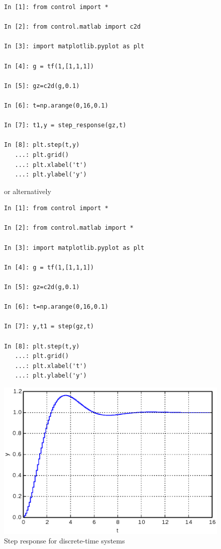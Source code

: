 \begin{figure}[htbp]	%
\begin{minipage}[t]{0.55\textwidth}
  \vspace{0pt}
\begin{lstlisting}[linewidth=7cm,xleftmargin=0cm]
In [1]: from control import *

In [2]: from control.matlab import c2d

In [3]: import matplotlib.pyplot as plt

In [4]: g = tf(1,[1,1,1])

In [5]: gz=c2d(g,0.1)

In [6]: t=np.arange(0,16,0.1)

In [7]: t1,y = step_response(gz,t)

In [8]: plt.step(t,y) 
   ...: plt.grid()
   ...: plt.xlabel('t')
   ...: plt.ylabel('y')
\end{lstlisting}

or alternatively

\begin{lstlisting}[linewidth=7cm,xleftmargin=0cm]
In [1]: from control import *

In [2]: from control.matlab import *

In [3]: import matplotlib.pyplot as plt

In [4]: g = tf(1,[1,1,1])

In [5]: gz=c2d(g,0.1)

In [6]: t=np.arange(0,16,0.1)

In [7]: y,t1 = step(gz,t)

In [8]: plt.step(t,y) 
   ...: plt.grid()
   ...: plt.xlabel('t')
   ...: plt.ylabel('y')
\end{lstlisting}
\end{minipage}%
\begin{minipage}[t]{0.5\textwidth}
  \vspace{0pt} \centering
  \includegraphics[width=\textwidth]{eps/dstepresp.eps}
\end{minipage}
\caption{Step response for discrete-time systems}
\label{F2}
\end{figure}

